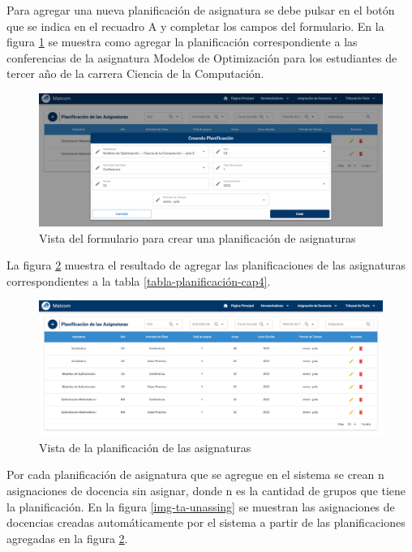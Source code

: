 Para agregar una nueva planificación de asignatura se debe pulsar en el 
botón que se indica en el recuadro A y completar los campos del formulario. 
En la figura \ref{img-pd-form} se muestra como agregar la planificación
correspondiente a las conferencias de la asignatura Modelos de Optimización
para los estudiantes de tercer año de la carrera Ciencia de la Computación. 

\begin{figure}[H]
    \includegraphics[scale=0.3]{Graphics/Implementation/Docencia/PD-form.png}
    \caption{Vista del formulario para crear una planificación de asignaturas}
    \label{img-pd-form}
\end{figure}


La figura \ref{img-pd-result} muestra el resultado de agregar las planificaciones de las asignaturas 
correspondientes a la tabla \ref{tabla-planificación-cap4}. 


\begin{figure}[H]
    \includegraphics[scale=0.3]{Graphics/Implementation/Docencia/PD-result.png}
    \caption{Vista de la planificación de las asignaturas}
    \label{img-pd-result}
\end{figure}

Por cada planificación de asignatura que se agregue en el sistema se crean n asignaciones 
de docencia sin asignar, donde n es la cantidad de grupos que tiene la planificación. En 
la figura \ref{img-ta-unassing} se muestran las asignaciones de docencias creadas automáticamente por el sistema 
a partir de las planificaciones agregadas en la figura \ref{img-pd-result}.

